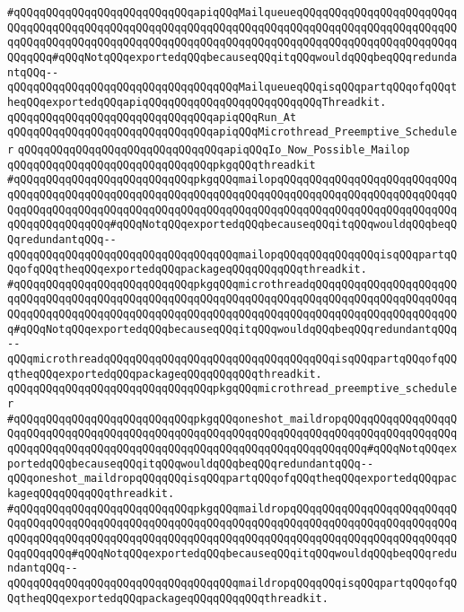 \verb|#qQQqqQQqqQQqqQQqqQQqqQQqqQQqapiqQQqMailqueueqQQqqQQqqQQqqQQqqQQqqQQqqQQqqQQqqQQqqQQqqQQqqQQqqQQqqQQqqQQqqQQqqQQqqQQqqQQqqQQqqQQqqQQqqQQqqQQqqQQqqQQqqQQqqQQqqQQqqQQqqQQqqQQqqQQqqQQqqQQqqQQqqQQqqQQqqQQqqQQqqQQqqQQqqQQq#qQQqNotqQQqexportedqQQqbecauseqQQqitqQQqwouldqQQqbeqQQqredundantqQQq--qQQqqQQqqQQqqQQqqQQqqQQqqQQqqQQqqQQqMailqueueqQQqisqQQqpartqQQqofqQQqtheqQQqexportedqQQqapiqQQqqQQqqQQqqQQqqQQqqQQqqQQqThreadkit.|\newline
\verb|qQQqqQQqqQQqqQQqqQQqqQQqqQQqqQQqapiqQQqRun_At|\newline
\verb|qQQqqQQqqQQqqQQqqQQqqQQqqQQqqQQqapiqQQqMicrothread_Preemptive_Scheduler|\newline
\verb|qQQqqQQqqQQqqQQqqQQqqQQqqQQqqQQqapiqQQqIo_Now_Possible_Mailop|\newline
\newline
\verb|qQQqqQQqqQQqqQQqqQQqqQQqqQQqqQQqpkgqQQqthreadkit|\newline
\verb|#qQQqqQQqqQQqqQQqqQQqqQQqqQQqpkgqQQqmailopqQQqqQQqqQQqqQQqqQQqqQQqqQQqqQQqqQQqqQQqqQQqqQQqqQQqqQQqqQQqqQQqqQQqqQQqqQQqqQQqqQQqqQQqqQQqqQQqqQQqqQQqqQQqqQQqqQQqqQQqqQQqqQQqqQQqqQQqqQQqqQQqqQQqqQQqqQQqqQQqqQQqqQQqqQQqqQQqqQQqqQQq#qQQqNotqQQqexportedqQQqbecauseqQQqitqQQqwouldqQQqbeqQQqredundantqQQq--qQQqqQQqqQQqqQQqqQQqqQQqqQQqqQQqqQQqmailopqQQqqQQqqQQqqQQqisqQQqpartqQQqofqQQqtheqQQqexportedqQQqpackageqQQqqQQqqQQqthreadkit.|\newline
\verb|#qQQqqQQqqQQqqQQqqQQqqQQqqQQqpkgqQQqmicrothreadqQQqqQQqqQQqqQQqqQQqqQQqqQQqqQQqqQQqqQQqqQQqqQQqqQQqqQQqqQQqqQQqqQQqqQQqqQQqqQQqqQQqqQQqqQQqqQQqqQQqqQQqqQQqqQQqqQQqqQQqqQQqqQQqqQQqqQQqqQQqqQQqqQQqqQQqqQQqqQQqqQQq#qQQqNotqQQqexportedqQQqbecauseqQQqitqQQqwouldqQQqbeqQQqredundantqQQq--qQQqmicrothreadqQQqqQQqqQQqqQQqqQQqqQQqqQQqqQQqqQQqisqQQqpartqQQqofqQQqtheqQQqexportedqQQqpackageqQQqqQQqqQQqthreadkit.|\newline
\verb|qQQqqQQqqQQqqQQqqQQqqQQqqQQqqQQqpkgqQQqmicrothread_preemptive_scheduler|\newline
\verb|#qQQqqQQqqQQqqQQqqQQqqQQqqQQqpkgqQQqoneshot_maildropqQQqqQQqqQQqqQQqqQQqqQQqqQQqqQQqqQQqqQQqqQQqqQQqqQQqqQQqqQQqqQQqqQQqqQQqqQQqqQQqqQQqqQQqqQQqqQQqqQQqqQQqqQQqqQQqqQQqqQQqqQQqqQQqqQQqqQQqqQQqqQQq#qQQqNotqQQqexportedqQQqbecauseqQQqitqQQqwouldqQQqbeqQQqredundantqQQq--qQQqoneshot_maildropqQQqqQQqisqQQqpartqQQqofqQQqtheqQQqexportedqQQqpackageqQQqqQQqqQQqthreadkit.|\newline
\verb|#qQQqqQQqqQQqqQQqqQQqqQQqqQQqpkgqQQqmaildropqQQqqQQqqQQqqQQqqQQqqQQqqQQqqQQqqQQqqQQqqQQqqQQqqQQqqQQqqQQqqQQqqQQqqQQqqQQqqQQqqQQqqQQqqQQqqQQqqQQqqQQqqQQqqQQqqQQqqQQqqQQqqQQqqQQqqQQqqQQqqQQqqQQqqQQqqQQqqQQqqQQqqQQqqQQqqQQq#qQQqNotqQQqexportedqQQqbecauseqQQqitqQQqwouldqQQqbeqQQqredundantqQQq--qQQqqQQqqQQqqQQqqQQqqQQqqQQqqQQqqQQqmaildropqQQqqQQqisqQQqpartqQQqofqQQqtheqQQqexportedqQQqpackageqQQqqQQqqQQqthreadkit.|\newline
